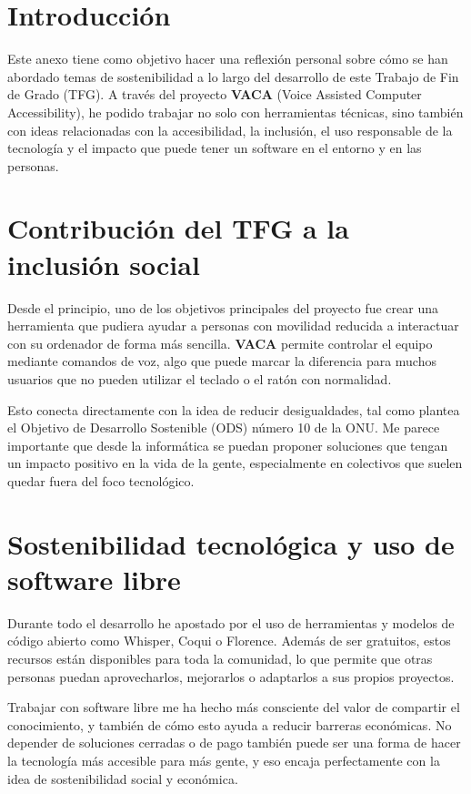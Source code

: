 
\section{Introducción}

Este anexo tiene como objetivo hacer una reflexión personal sobre cómo se han abordado temas de sostenibilidad a lo largo del desarrollo de este Trabajo de Fin de Grado (TFG). A través del proyecto \textbf{VACA} (Voice Assisted Computer Accessibility), he podido trabajar no solo con herramientas técnicas, sino también con ideas relacionadas con la accesibilidad, la inclusión, el uso responsable de la tecnología y el impacto que puede tener un software en el entorno y en las personas.

\section{Contribución del TFG a la inclusión social}

Desde el principio, uno de los objetivos principales del proyecto fue crear una herramienta que pudiera ayudar a personas con movilidad reducida a interactuar con su ordenador de forma más sencilla. \textbf{VACA} permite controlar el equipo mediante comandos de voz, algo que puede marcar la diferencia para muchos usuarios que no pueden utilizar el teclado o el ratón con normalidad.

Esto conecta directamente con la idea de reducir desigualdades, tal como plantea el Objetivo de Desarrollo Sostenible (ODS) número 10 de la ONU. Me parece importante que desde la informática se puedan proponer soluciones que tengan un impacto positivo en la vida de la gente, especialmente en colectivos que suelen quedar fuera del foco tecnológico.

\section{Sostenibilidad tecnológica y uso de software libre}

Durante todo el desarrollo he apostado por el uso de herramientas y modelos de código abierto como Whisper, Coqui o Florence. Además de ser gratuitos, estos recursos están disponibles para toda la comunidad, lo que permite que otras personas puedan aprovecharlos, mejorarlos o adaptarlos a sus propios proyectos.

Trabajar con software libre me ha hecho más consciente del valor de compartir el conocimiento, y también de cómo esto ayuda a reducir barreras económicas. No depender de soluciones cerradas o de pago también puede ser una forma de hacer la tecnología más accesible para más gente, y eso encaja perfectamente con la idea de sostenibilidad social y económica.

